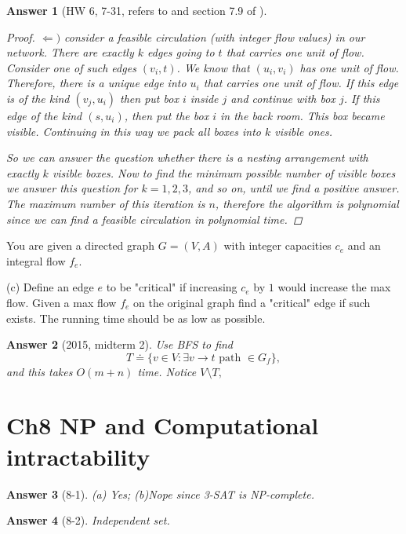 \documentclass[11pt]{article}
\theoremstyle{numberplain}
\theoremstyle{nonumberplain}
\newtheorem{proof}{Proof}
\newtheorem{ans}{Answer}
\newcommand{\0}{{\mathbf{0}}}
\begin{document}
\begin{ans}[HW 6, 7-31, refers to \cite{solcornell} and section 7.9 of \cite{jon2005algorithm}]
\begin{proof}
$\Leftarrow )$  consider a feasible circulation (with integer flow values) in our network.
There are exactly $k$ edges going to $t$ that carries one unit of flow.
Consider one of such edges $(v_i,t)$.
We know that $(u_i,v_i)$ has one unit of flow.
Therefore, there is a unique edge into $u_i$ that carries one unit of flow.
If this edge is of the kind $(v_j,u_i)$ then put box $i$ inside $j$ and
continue with box $j$.
If this edge of the kind $(s,u_i)$, then put the box $i$ in the back room.
This box became visible.
Continuing in this way we pack all boxes into $k$ visible ones.

\bigskip

So we can answer the question whether there is
a nesting arrangement with exactly $k$ visible boxes.
Now to find the minimum possible number of visible boxes we answer
this question for $k=1,2,3$, and so on, until we find a positive answer.
The maximum number of this iteration is $n$, therefore the algorithm is
polynomial since we can find a feasible circulation in polynomial time.
\end{proof}
\end{ans}

\begin{ques}[2015, midterm 2]
You are given a directed graph $G=(V,A)$ with integer capacities $c_e$ and an integral flow $f_e$.

(c) Define an edge $e$ to be "critical" if increasing $c_e$ by $1$ would increase the max flow. Given a max flow $f_e$ on the original graph find a "critical" edge if such exists. The running time should be as low as possible.
\end{ques}

\begin{ans}[2015, midterm 2]
Use BFS to find $$T\doteq \{ v\in V: \exists v\to t\text{ path }\in G_f
\},$$
and this takes $O(m+n)$ time. Notice $V\setminus T, $
\end{ans}

\section{Ch8 NP and Computational intractability}

\begin{ans}[8-1](a) Yes; (b)Nope since 3-SAT is NP-complete.
\end{ans}
\begin{ans}[8-2] Independent set.
\end{ans}
\end{document}
